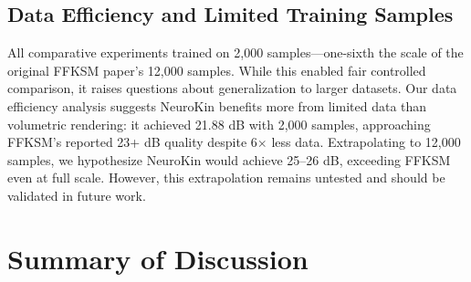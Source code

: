 \documentclass[12pt,a4paper,oneside]{report}
\begin{document}
\subsection{Data Efficiency and Limited Training Samples}

All comparative experiments trained on 2,000 samples---one-sixth the scale of the original FFKSM paper's 12,000 samples. While this enabled fair controlled comparison, it raises questions about generalization to larger datasets. Our data efficiency analysis suggests NeuroKin benefits more from limited data than volumetric rendering: it achieved 21.88 dB with 2,000 samples, approaching FFKSM's reported 23+ dB quality despite 6$\times$ less data. Extrapolating to 12,000 samples, we hypothesize NeuroKin would achieve 25--26 dB, exceeding FFKSM even at full scale. However, this extrapolation remains untested and should be validated in future work.

\section{Summary of Discussion}
\end{document}
